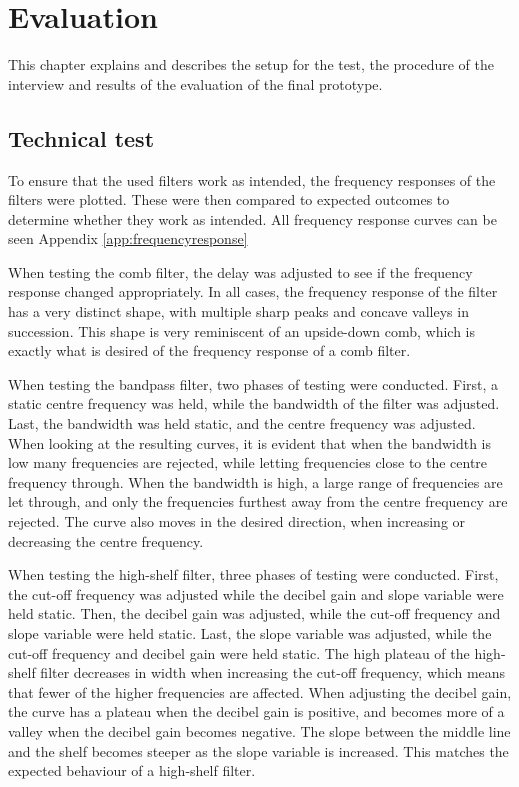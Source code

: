 \chapter{Evaluation}\label{ch:evaluation}

This chapter explains and describes the setup for the test, the procedure of the interview and results of the evaluation of the final prototype. 

\section{Technical test}
To ensure that the used filters work as intended, the frequency responses of the filters were plotted. These were then compared to expected outcomes to determine whether they work as intended. All frequency response curves can be seen Appendix \ref{app:frequencyresponse}

When testing the comb filter, the delay was adjusted to see if the frequency response changed appropriately. In all cases, the frequency response of the filter has a very distinct shape, with multiple sharp peaks and concave valleys in succession. This shape is very reminiscent of an upside-down comb, which is exactly what is desired of the frequency response of a comb filter.

When testing the bandpass filter, two phases of testing were conducted. First, a static centre frequency was held, while the bandwidth of the filter was adjusted. Last, the bandwidth was held static, and the centre frequency was adjusted. When looking at the resulting curves, it is evident that when the bandwidth is low many frequencies are rejected, while letting frequencies close to the centre frequency through. When the bandwidth is high, a large range of frequencies are let through, and only the frequencies furthest away from the centre frequency are rejected. The curve also moves in the desired direction, when increasing or decreasing the centre frequency.

When testing the high-shelf filter, three phases of testing were conducted. First, the cut-off frequency was adjusted while the decibel gain and slope variable were held static. Then, the decibel gain was adjusted, while the cut-off frequency and slope variable were held static. Last, the slope variable was adjusted, while the cut-off frequency and decibel gain were held static. The high plateau of the high-shelf filter decreases in width when increasing the cut-off frequency, which means that fewer of the higher frequencies are affected. When adjusting the decibel gain, the curve has a plateau when the decibel gain is positive, and becomes more of a valley when the decibel gain becomes negative. The slope between the middle line and the shelf becomes steeper as the slope variable is increased. This matches the expected behaviour of a high-shelf filter.

